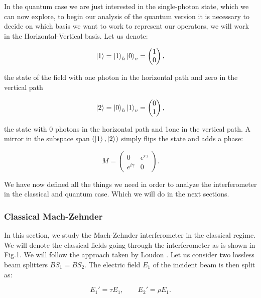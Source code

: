 \documentclass[12pt]{article}
\begin{document}
In the quantum case we are just interested in the single-photon state, which we can now explore, to begin our analysis of the quantum version it is necessary to decide on which basis we want to work to represent our operators, we will work in the Horizontal-Vertical basis. Let us denote:

 \begin{equation}
 \ket{1}=\ket{1}_{h}\ket{0}_{v}=\begin{pmatrix} 1 \\0\end{pmatrix},
 \end{equation} 

the state of the field with one photon in the horizontal path and zero in the vertical path

 \begin{equation}
 \ket{2}=\ket{0}_{h}\ket{1}_{v}=\begin{pmatrix} 0 \\1 \end{pmatrix},
 \end{equation}
 
the state with 0 photons in the horizontal path and 1one in the vertical path. A mirror in the subspace span $(\ket{1},\ket{2})$ simply flips the state and adds a phase: 
 
\begin{equation}
M=\begin{pmatrix} 0& e^{i\gamma}  \\ e^{i\gamma} & 0 \end{pmatrix}.
\end{equation}

We have now defined all the things we need in order to analyze the interferometer in the classical and quantum case. Which we will do in the next sections.



\subsubsection{Classical Mach-Zehnder}

In this section, we study the Mach-Zehnder interferometer in the classical regime. We will denote the classical fields going through the interferometer as is shown in Fig.1. We will follow the approach taken by Loudon \cite{loudon}. Let us consider two lossless beam splitters   $BS_{1}=BS_{2}$. The electric field $E_{1}$ of the incident beam is then split as:

\begin{equation}
E_{1}'=\tau E_{1} ,\qquad E_{2}'=\rho E_{1}.
\end{equation}
\end{document}
